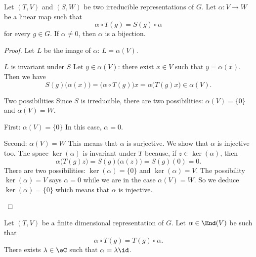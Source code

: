 \begin{lemma}
    Let \( (T,V)\) and \( (S,W)\) be two irreducible representations of \( G\). Let \( \alpha\colon V\to W\) be a linear map such that
    \begin{equation}
        \alpha\circ T(g)=S(g)\circ \alpha
    \end{equation}
    for every \( g\in G\). If \( \alpha\neq 0\), then \( \alpha\) is a bijection.
\end{lemma}

\begin{proof}
    Let \( L\) be the image of \( \alpha\): \( L=\alpha(V)\).
    \begin{subproof}
        \item[\( L\) is invariant under \( S\)]
            Let \( y\in \alpha(V)\): there exist \( x\in V\) such that \( y=\alpha(x)\). Then we have
            \begin{equation}
                S(g)\big( \alpha(x) \big)=\big( \alpha\circ T(g) \big)x=\alpha\big( T(g)x \big)\in \alpha(V).
            \end{equation}
        \item[Two possibilities]
            Since \( S\) is irreducible, there are two possibilities: \( \alpha(V)=\{ 0 \}\) and \( \alpha(V)=W\).
        \item[First: \( \alpha(V)=\{ 0 \}\)]
            In this case, \( \alpha=0\).
        \item[Second: \( \alpha(V)=W\)]
            This means that \( \alpha\) is surjective. We show that \( \alpha\) is injective too. The space \( \ker(\alpha)\) is invariant under \( T\) because, if \( z\in \ker(\alpha)\), then
            \begin{equation}
                \alpha\big( T(g)z \big)=S(g)\big( \alpha(z) \big)=S(g)(0)=0.
            \end{equation}
            There are two possibilities: \( \ker(\alpha)=\{ 0 \}\) and \( \ker(\alpha)=V\). The possibility \( \ker(\alpha)=V\) says \( \alpha=0\) while we are in the case \( \alpha(V)=W\). So we deduce \( \ker(\alpha)=\{ 0 \}\) which means that \( \alpha\) is injective.
    \end{subproof}
\end{proof}

\begin{theorem}   \label{THOooXHVHooDQdgDI}
    Let \( (T,V)\) be a finite dimensional representation of \( G\). Let \( \alpha\in \End(V)\) be such that
    \begin{equation}
        \alpha\circ T(g)=T(g)\circ \alpha.
    \end{equation}
    There exists \( \lambda\in \eC\) such that \( \alpha=\lambda\id\).
\end{theorem}

